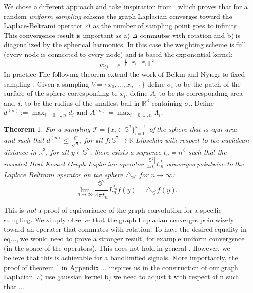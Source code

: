 \documentclass{article} %
\newtheorem{theorem}{Theorem}[section]
\newcommand{\norm}[1]{\left\lVert#1\right\rVert}
\newcommand{\nati}[1]{{\color[rgb]{.3,.5,.9}{#1}}}
\begin{document}
We chose a different approach and take inspiration from \cite{belkin2005towards}, which proves that for a random \emph{uniform sampling} scheme the graph Laplacian converges toward the Laplace-Beltrami operator $\Delta$ as the number of sampling point goes to infinity.
This convergence result is important as a) $\Delta$ commutes with rotation and b) is diagonalized by the spherical harmonics. 
In this case the weighting scheme is full (every node is connected to every node) and is based the exponential kernel: 
\nati{@martino, please check this equation... Do you use 4t?}
\begin{equation} \label{eq:belkin_weights}
w_{ij} = e^{-\frac{1}{t} \norm{x_i-x_j}^2}
\end{equation}
In practice
The following theorem extend the work of Belkin and Nyiogi to fixed sampling \nati{(Including Healpix or not?)}. 
Given a sampling $V = \{x_0, \dots, x_{n-1}\}$ define $\sigma_i$ to be the patch of the surface of the sphere corresponding to $x_i$, define $A_i$ to be its corresponding area and $d_i$ to be the radius of the smallest ball in $\mathbb R^3$ containing $\sigma_i$. Define $d^{(n)} := \max_{i=0, \dots, n}d_i$ and $A^{(n)}=\max_{i=0, \dots, n}A_i$.

\begin{theorem}
	For a sampling $\mathcal P = \{x_i\in\mathbb S^2\}_{i=0}^{n-1}$ of the sphere that is equi area and such that $d^{(n)} \leq \frac{C}{\sqrt{n}}$, for all $f: \mathbb S^2 \rightarrow \mathbb R$ Lipschitz with respect to the euclidean distance in $\mathbb R^3$, for all $y\in\mathbb S^2$, there exists a sequence $t_n = n^\beta$ such that the rescaled Heat Kernel Graph Laplacian operator $\frac{|\mathbb S^2|}{4\pi t_n}L^t_n$ converges pointwise to the Laplace Beltrami operator on the sphere $\triangle_{\mathbb S^2}$  for $n\to\infty$:
	$$ \lim_{n\to\infty}\frac{|\mathbb S^2|}{4\pi t_n} L_n^{t_n}f(y) =  \triangle_{\mathbb S^2}f(y).$$
	\label{theo:pointwise convergence for a regular sampling}
\end{theorem}

This is \emph{not} a proof of equivariance of the graph convolution for a specific sampling. We simply observe that the graph Laplacian converges pointwisely toward an operator that commutes with rotation. To have the desired equality in eq..., we would need to prove a stronger result, for example uniform convergence (in the space of the operators).
\nati{Should we put this here?: }
This does not hold in general \cite{belkin2007convergence}. However, we believe that this is achievable for a bandlimited signals.
More importantly, the proof of theorem \ref{theo:pointwise convergence for a regular sampling} in Appendix ... inspires us in the construction of our graph Laplacian. a) use gaussian kernel b) we need to adjust t with respect of n such that ...
\end{document}
